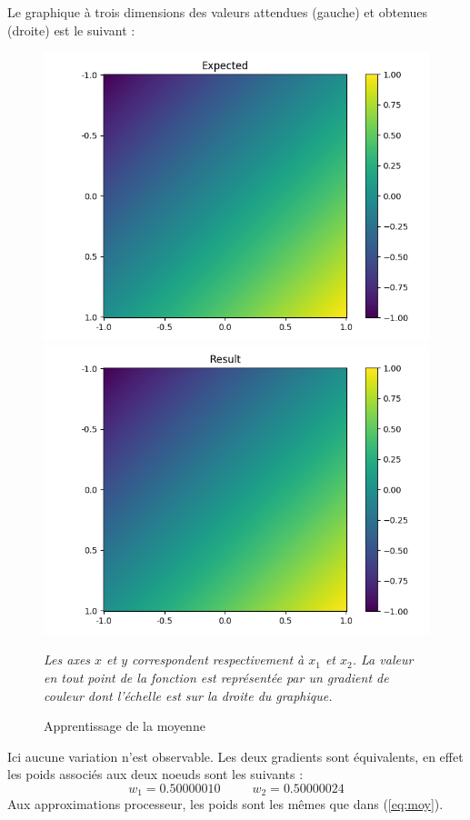 Le graphique à trois dimensions des valeurs attendues (gauche) et obtenues (droite) est le suivant :
\begin{figure}[H]
    \center
    \includegraphics[width=0.49\columnwidth]{pict/moy/expected}
    \includegraphics[width=0.49\columnwidth]{pict/moy/result}
	\caption{Apprentissage de la moyenne}
    \vspace{-10pt}
    \begin{center}
        \footnotesize
        \textit{
        Les axes $x$ et $y$ correspondent respectivement à $x_1$ et $x_2$.
        La valeur en tout point de la fonction est représentée par un gradient de couleur
        dont l'échelle est sur la droite du graphique.
        }
    \end{center}
	\label{fig:moy}
\end{figure}
\vspace{-12pt}
Ici aucune variation n'est observable.
Les deux gradients sont équivalents, en effet les poids associés aux deux noeuds sont les suivants :
\begin{equation*}
    w_1 = 0.50000010
    \;\;\;\;\;\;\;\;\;
    w_2 = 0.50000024
\end{equation*}
Aux approximations processeur, les poids sont les mêmes que dans (\ref{eq:moy}).


